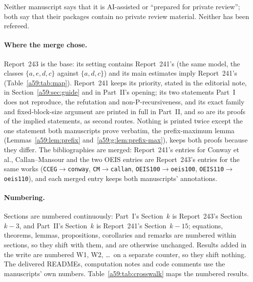 \documentclass[11pt,letterpaper]{article}
\theoremstyle{remark}\newtheorem{remark}[theorem]{Remark}
\theoremstyle{remark}\newtheorem{wremark}{Remark}\renewcommand{\thewremark}{W\arabic{wremark}}
\theoremstyle{plain}\newtheorem{wcorollary}[wremark]{Corollary}
\begin{document}
Neither manuscript says that it is AI-assisted or ``prepared for private
review''; both say that their packages contain no private review material.
Neither has been refereed.

\paragraph{Where the merge chose.} Report~243 is the base: its setting
contains Report~241's (the same model, the classes $\{a,e,d,c\}$ against
$\{a,d,c\}$) and its main estimates imply Report~241's
(Table~\ref{a59:tab:map}). Report~241 keeps its priority, stated in the
editorial note, in Section~\ref{a59:sec:guide} and in Part~II's opening;
its two statements Part~I does not reproduce, the refutation and
non-P-recursiveness, and its exact family and fixed-block-size argument
are printed in full in Part~II, and so are its proofs of the implied
statements, as second routes. Nothing is printed twice except the one
statement both manuscripts prove verbatim, the prefix-maximum lemma (Lemmas~\ref{a59:lem:prefix}
and~\ref{a59:g:lem:prefix-max}), keeps both proofs because they differ.
The bibliographies are merged: Report~241's entries for Conway et al.,
Callan--Mansour and the two OEIS entries are Report~243's entries for the
same works (\texttt{CCEG}$\to$\texttt{conway}, \texttt{CM}$\to$\texttt{callan},
\texttt{OEIS100}$\to$\texttt{oeis100}, \texttt{OEIS110}$\to$\texttt{oeis110}),
and each merged entry keeps both manuscripts' annotations.

\paragraph{Numbering.} Sections are numbered continuously: Part~I's
Section~$k$ is Report~243's Section~$k-3$, and Part~II's Section~$k$ is
Report~241's Section~$k-15$; equations, theorems, lemmas, propositions,
corollaries and remarks are numbered within sections, so they shift with
them, and are otherwise unchanged. Results added in the write are numbered
W1, W2, \dots\ on a separate counter, so they shift nothing. The delivered
READMEs, computation notes and code comments use the manuscripts' own
numbers. Table~\ref{a59:tab:crosswalk} maps the numbered results.
\end{document}
